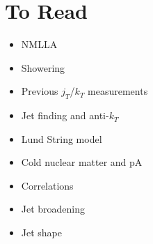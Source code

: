 \documentclass[12pt]{article}
\begin{document}
\section{To Read}
\begin{itemize}
\item NMLLA~\cite{nmlla}
\item Showering~\cite{Gieseke:2003rz}
\item Previous $j_T$/$k_T$ measurements~\cite{cdfpaper,atlaksenJetit}
\item Jet finding and anti-$k_T$~\cite{antikt}
\item Lund String model~\cite{lundString}
\item Cold nuclear matter and pA~\cite{cnmEffect,protonNucleusOpportunities}
\item Correlations~\cite{thorstenBiasProceedings,Renk:2011wp}
\item Jet broadening~\cite{jetBroadeningPpb1,jetBroadeningAA,antiangularOrdering}
\item Jet shape~\cite{jetShapeQGP}
\end{itemize}

%
%


\end{document}
